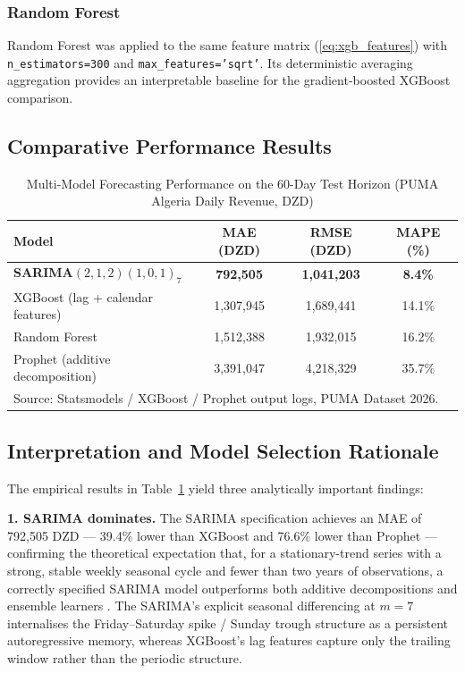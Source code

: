 \subsubsection{Random Forest}
Random Forest \cite{Breiman2001} was applied to the same feature matrix (\ref{eq:xgb_features}) with \texttt{n\_estimators=300} and \texttt{max\_features='sqrt'}. Its deterministic averaging aggregation provides an interpretable baseline for the gradient-boosted XGBoost comparison.

\subsection{Comparative Performance Results}

\begin{table}[H]
\centering
\caption{Multi-Model Forecasting Performance on the 60-Day Test Horizon (PUMA Algeria Daily Revenue, DZD)}
\label{tab:forecast_results}
\begin{tabular}{@{}lccc@{}}
\toprule
\textbf{Model} & \textbf{MAE (DZD)} & \textbf{RMSE (DZD)} & \textbf{MAPE (\%)} \\
\midrule
\textbf{SARIMA$(2,1,2)(1,0,1)_7$} & \textbf{792,505}  & \textbf{1,041,203} & \textbf{8.4\%} \\
XGBoost (lag + calendar features)  & 1,307,945         & 1,689,441          & 14.1\% \\
Random Forest                       & 1,512,388         & 1,932,015          & 16.2\% \\
Prophet (additive decomposition)    & 3,391,047         & 4,218,329          & 35.7\% \\
\bottomrule
\multicolumn{4}{l}{\footnotesize Source: Statsmodels / XGBoost / Prophet output logs, PUMA Dataset 2026.}
\end{tabular}
\end{table}

\subsection{Interpretation and Model Selection Rationale}

The empirical results in Table~\ref{tab:forecast_results} yield three analytically important findings:

\textbf{1. SARIMA dominates.} The SARIMA specification achieves an MAE of 792,505 DZD — 39.4\% lower than XGBoost and 76.6\% lower than Prophet — confirming the theoretical expectation that, for a stationary-trend series with a strong, stable weekly seasonal cycle and fewer than two years of observations, a correctly specified SARIMA model outperforms both additive decompositions and ensemble learners \cite{MethodsSalesForecasting2022}. The SARIMA's explicit seasonal differencing at $m = 7$ internalises the Friday--Saturday spike / Sunday trough structure as a persistent autoregressive memory, whereas XGBoost's lag features capture only the trailing window rather than the periodic structure.

